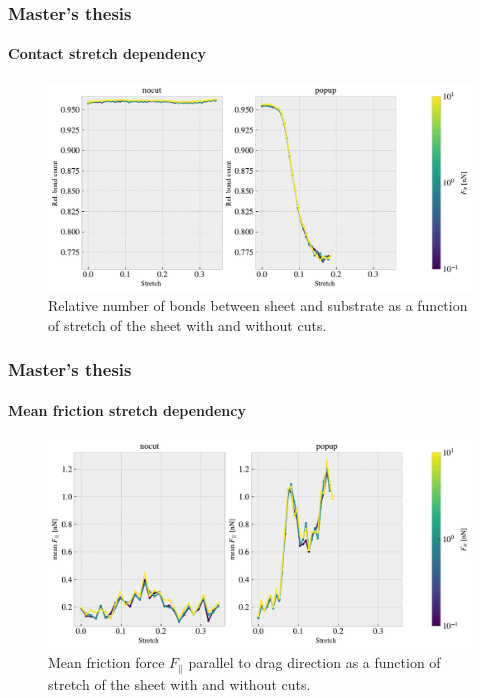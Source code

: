 \documentclass[
	10pt, %
]{beamer}
\begin{document}
\begin{frame}
	\frametitle{Master's thesis}
	\framesubtitle{Contact stretch dependency}
	\begin{figure}
		\includegraphics[width=\linewidth]{figures/multi_3.pdf}
		\caption{Relative number of bonds between sheet and substrate as a function of stretch of the sheet with and without cuts.}
	\end{figure}	
\end{frame}

\begin{frame}
	\frametitle{Master's thesis}
	\framesubtitle{Mean friction stretch dependency}
	\begin{figure}
		\includegraphics[width=\linewidth]{figures/multi_2.pdf}
		\caption{Mean friction force $F_{\parallel}$ parallel to drag direction as a function of stretch of the sheet with and without cuts.}
	\end{figure}	
\end{frame}


\end{document}
